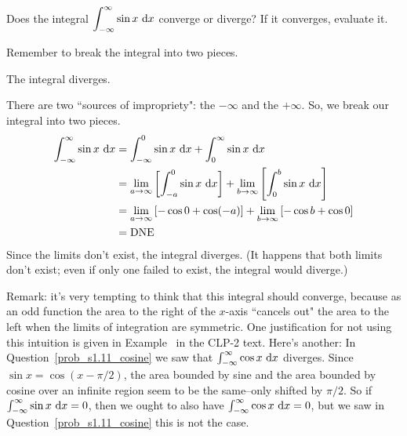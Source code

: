 \begin{Mquestion}\label{prob_s1.11_sine}
Does the integral $\displaystyle\int_{-\infty}^\infty \sin x~\mathrm{d}x$ converge or diverge?
 If it converges, evaluate it.
\end{Mquestion}
\begin{hint}
Remember to break the integral into two pieces.
\end{hint}
\begin{answer}
The integral diverges.
\end{answer}
\begin{solution}
There are two ``sources of impropriety": the $-\infty$ and the $+\infty$. So, we break our integral into two pieces.
\begin{align*}
\int_{-\infty}^\infty \sin x~\mathrm{d}x&=\int_{-\infty}^0 \sin x~\mathrm{d}x+\int_{0}^\infty \sin x~\mathrm{d}x\\
&=\lim_{a \to \infty }\left[\int_{-a}^0 \sin x~\mathrm{d}x\right]+
\lim_{b \to \infty }\left[\int_{0}^b \sin x~\mathrm{d}x\right]\\
&=\lim_{a \to \infty }\left[-\cos 0 + \cos(- a)
\right]+
\lim_{b \to \infty }\left[-\cos b + \cos 0
\right]\\
&=\text{DNE}
\end{align*}
Since the limits don't exist, the integral diverges. (It happens that both limits don't exist; even if only one failed to exist, the integral would diverge.)

Remark: it's very tempting to think that this integral should converge, because as an odd function the area to the right of the $x$-axis ``cancels out" the area to the left when the limits of integration are symmetric. One justification for not using this intuition is given in Example~ in the CLP-2 text. Here's another:
In Question~\ref{prob_s1.11_cosine} we saw that $\int_{-\infty}^\infty \cos x~\mathrm{d}x$ diverges. Since $\sin x = \cos (x-\pi/2)$, the area bounded by sine and the area bounded by cosine over an infinite region seem to be the same--only shifted by $\pi/2$. So if $\int_{-\infty}^\infty \sin x~\mathrm{d}x=0$, then we ought to also have $\int_{-\infty}^\infty \cos x~\mathrm{d}x=0$, but we saw in Question~\ref{prob_s1.11_cosine} this is not the case.

\begin{center}
\end{center}
\end{solution}

